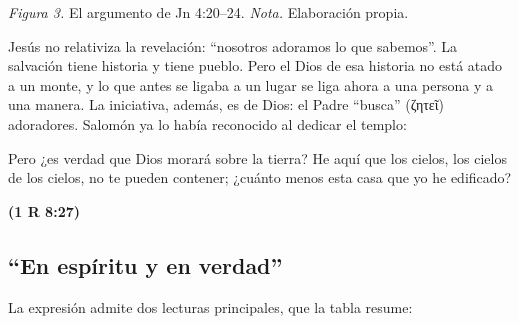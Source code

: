 \documentclass[11pt,letterpaper]{article}
\newcommand{\grc}[1]{\foreignlanguage{ancientgreek}{#1}}
\newcommand{\fuente}[1]{\par\hfill{\upshape\bfseries\small\textcolor{azul}{#1}}}
\begin{document}
\begin{center}
\par
{\footnotesize\color{gris}\textit{Figura 3.} El argumento de Jn 4:20--24. \textit{Nota.} Elaboración propia.}
\end{center}

Jesús no relativiza la revelación: ``nosotros adoramos lo que sabemos''. La salvación tiene historia y tiene pueblo. Pero el Dios de esa historia no está atado a un monte, y lo que antes se ligaba a un lugar se liga ahora a una persona y a una manera. La iniciativa, además, es de Dios: el Padre ``busca'' (\grc{ζητεῖ}) adoradores. Salomón ya lo había reconocido al dedicar el templo:

\begin{cita}Pero ¿es verdad que Dios morará sobre la tierra? He aquí que los cielos, los cielos de los cielos, no te pueden contener; ¿cuánto menos esta casa que yo he edificado?\fuente{(1 R 8:27)}\end{cita}

\subsection{``En espíritu y en verdad''}

La expresión admite dos lecturas principales, que la tabla resume:
\end{document}
